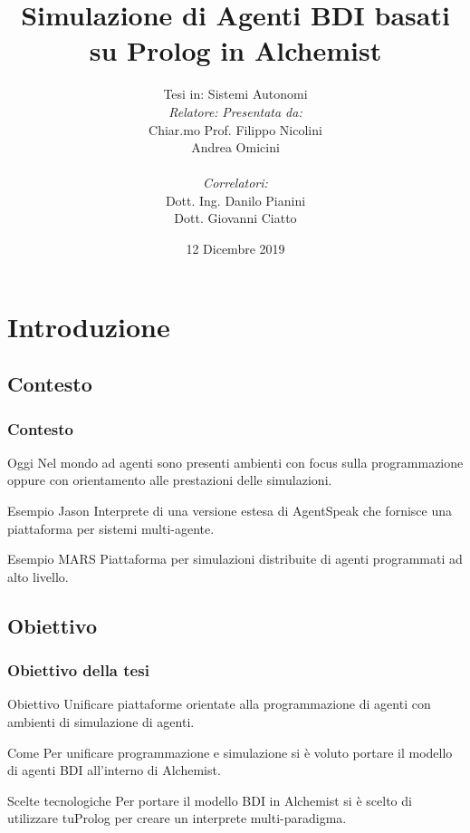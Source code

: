 \documentclass[handout]{beamer}\mode<presentation>{\usetheme{AMSCesenaBleu}}
\title[Agenti BDI basati su Prolog in Alchemist]{Simulazione di Agenti BDI basati su Prolog in Alchemist}
\author[Filippo Nicolini]{Tesi in: Sistemi Autonomi\\
[0.5cm]
\textit{Relatore:} \hspace{6.55cm} \textit{Presentata da:}\\
Chiar.mo Prof. \hspace{5.5cm} Filippo Nicolini\\
Andrea Omicini \hspace{7.6cm} \phantom{g}\\
\textit{\\Correlatori:} \hspace{8.25cm} \phantom{g}\\
Dott. Ing. Danilo Pianini \hspace{6cm} \phantom{g}\\
Dott. Giovanni Ciatto \hspace{6.5cm} \phantom{g}\\
}
\institute[]{
\textsc{Alma Mater Studiorum} -- Università di Bologna \\
Campus di Cesena}
\date{12 Dicembre 2019}
\begin{document}
\maketitle


\section{Introduzione}

\subsection{Contesto}
\begin{frame}
\frametitle{Contesto}
\begin{block}{Oggi}
Nel mondo ad agenti sono presenti ambienti con focus sulla programmazione oppure con orientamento alle prestazioni delle simulazioni.
\end{block}

\begin{block}{Esempio Jason}
Interprete di una versione estesa di AgentSpeak che fornisce una piattaforma per sistemi multi-agente.
\end{block}

\begin{block}{Esempio MARS}
Piattaforma per simulazioni distribuite di agenti programmati ad alto livello.
\end{block}
\end{frame}

\subsection{Obiettivo}
\begin{frame}
\frametitle{Obiettivo della tesi}
\begin{block}{Obiettivo}
\alert{Unificare} piattaforme orientate alla \alert{programmazione di agenti} con ambienti di \alert{simulazione di agenti}.
\end{block}

\begin{block}{Come}
Per unificare programmazione e simulazione si è voluto portare il modello di agenti BDI all'interno di Alchemist.
\end{block}

\begin{block}{Scelte tecnologiche}
Per portare il modello BDI in Alchemist si è scelto di utilizzare tuProlog per creare un interprete multi-paradigma.
\end{block}
\end{frame}
\end{document}
